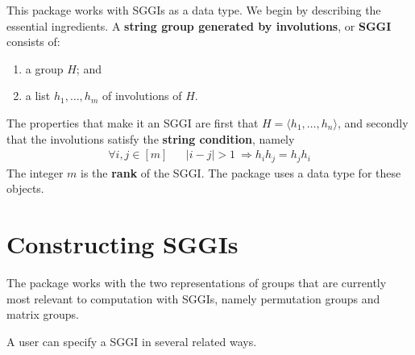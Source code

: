 \documentclass{documentation}
\begin{document}
This package works with SGGIs as a data type. We begin by describing the essential ingredients.
A {\bf string group generated by involutions}, or {\bf SGGI} consists of: 
  \begin{enumerate}
  \item a group $H$; and 
  \item a list $h_1,\ldots,h_m$ of involutions of $H$.
  \end{enumerate}
The properties that make it an SGGI are first that $H=\langle h_1,\ldots,h_n\rangle$, and 
secondly that the involutions satisfy the {\bf string condition}, namely 
\begin{align}
\label{eq:string}
\forall i,j\in[m] && |i-j|>1~\Longrightarrow
h_ih_j=h_jh_i
\end{align}
The integer $m$ is the {\bf rank} of the SGGI. The package uses a data type {\color{blue}{\tt SGGI}} for these objects. 

\section{Constructing SGGIs}
\label{sec:construct}
The package works with the two representations of groups that are currently most relevant to computation with SGGIs, namely 
permutation groups and matrix groups.
\medskip

A user can specify a SGGI in several related ways.
\end{document}
